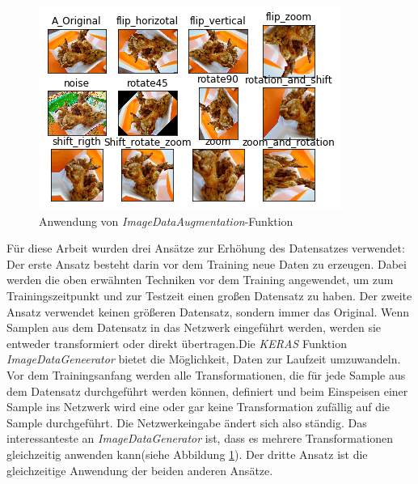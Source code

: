\documentclass[12pt,a4paper]{scrartcl}
\numberwithin{equation}{section}
\begin{document}
\begin{figure}[h!]
	\centering
	\includegraphics[width=\textwidth]{ImageDataAugmaentation.png}
	\caption{Anwendung von \textit{ImageDataAugmentation}-Funktion }
	\label{fig:ImageDataAugmentation}
\end{figure}

Für diese Arbeit wurden drei Ansätze zur Erhöhung des Datensatzes verwendet:
Der erste Ansatz besteht darin vor dem Training neue Daten zu erzeugen. Dabei werden die oben erwähnten Techniken vor dem Training angewendet, um zum Trainingszeitpunkt und zur Testzeit einen großen Datensatz zu haben. Der zweite Ansatz verwendet keinen größeren Datensatz, sondern immer das Original. Wenn Samplen aus dem Datensatz in das Netzwerk eingeführt werden, werden sie entweder transformiert oder direkt übertragen.Die \textit{KERAS} Funktion \textit{ImageDataGeneerator} bietet die Möglichkeit, Daten zur Laufzeit umzuwandeln. Vor dem Trainingsanfang werden alle Transformationen, die für jede Sample aus dem Datensatz durchgeführt werden können, definiert und beim Einspeisen einer Sample ins Netzwerk wird eine oder gar keine Transformation zufällig auf die Sample durchgeführt. Die Netzwerkeingabe ändert sich also ständig. Das interessanteste an \textit{ImageDataGenerator} ist, dass es mehrere Transformationen gleichzeitig anwenden kann(siehe Abbildung \ref{fig:ImageDataAugmentation}). Der dritte Ansatz ist die gleichzeitige Anwendung der beiden anderen Ansätze.
\end{document}
